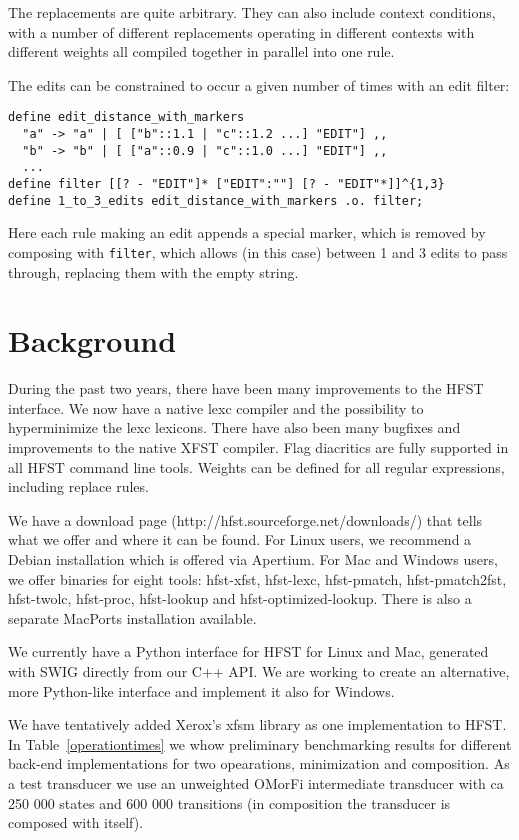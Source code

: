 \documentclass{llncs}
\begin{document}
The replacements are quite arbitrary. They can also include context conditions,
with a number of different replacements operating in different contexts with
different weights all compiled together in parallel into one rule.

The edits can be constrained to occur a given number of times with an edit
filter:

\begin{framed}
\begin{verbatim}
define edit_distance_with_markers
  "a" -> "a" | [ ["b"::1.1 | "c"::1.2 ...] "EDIT"] ,,
  "b" -> "b" | [ ["a"::0.9 | "c"::1.0 ...] "EDIT"] ,,
  ...
define filter [[? - "EDIT"]* ["EDIT":""] [? - "EDIT"*]]^{1,3}
define 1_to_3_edits edit_distance_with_markers .o. filter;
\end{verbatim}
\end{framed}

Here each rule making an edit appends a special marker, which is removed
by composing with \verb+filter+, which allows (in this case) between 1 and 3
edits to pass through, replacing them with the empty string.

\section{Background}\label{sec:background}
During the past two years, there have been many improvements to the HFST 
interface. We now have a native lexc compiler and the possibility to 
hyperminimize the lexc lexicons. There have also been many bugfixes and 
improvements to the native XFST compiler. Flag diacritics are fully supported 
in all HFST command line tools. Weights can be defined for all regular expressions,
including replace rules.

We have a download page (http://hfst.sourceforge.net/downloads/) that tells what 
we offer and where it can be found. For Linux users, we recommend a Debian installation
which is offered via Apertium. For Mac and Windows users,
we offer binaries for eight tools: hfst-xfst, hfst-lexc, hfst-pmatch,
hfst-pmatch2fst, hfst-twolc, hfst-proc, hfst-lookup and hfst-optimized-lookup.
There is also a separate MacPorts installation available.

We currently have a Python interface for HFST for Linux and Mac, generated with SWIG directly
from our C++ API. We are working to create an alternative, more Python-like interface
and implement it also for Windows.

We have tentatively added Xerox's xfsm library as one implementation to HFST.
In Table~\ref{operationtimes} we whow preliminary benchmarking results for different back-end
implementations for two opearations, minimization and composition. As a test transducer we use an 
unweighted OMorFi intermediate transducer with ca 250 000 states and 600 000 transitions (in composition
the transducer is composed with itself).
\end{document}
